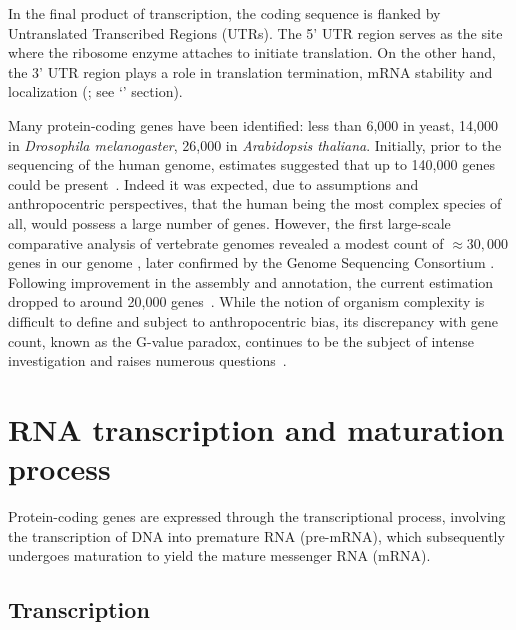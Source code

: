 In the final product of transcription, the coding sequence is flanked by Untranslated Transcribed Regions (\acrshort{UTR}s). The 5' \acrshort{UTR} region serves as the site where the ribosome enzyme attaches to initiate translation. On the other hand, the 3' \acrshort{UTR} region plays a role in translation termination, \acrshort{mRNA} stability and localization (\citet{ grzybowska_regulatory_2001, chabanon_zipcodes_2004, mayr_what_2019}; see `' section).

Many protein-coding genes have been identified: less than 6,000 in yeast, 14,000 in \textit{Drosophila melanogaster}, 26,000 in \textit{Arabidopsis thaliana}. Initially, prior to the sequencing of the human genome, estimates suggested that up to 140,000 genes could be present~\citep{fields_how_1994}. Indeed it was expected, due to assumptions and anthropocentric perspectives, that the human being the most complex species of all, would possess a large number of genes. However, the first large-scale comparative analysis of vertebrate genomes revealed a modest count of $\approx30,000$ genes in our genome \citep{roest_crollius_estimate_2000}, later confirmed by the Genome Sequencing Consortium \citep{lander_initial_2001, venter_sequence_2001}. Following improvement in the assembly and annotation, the current estimation dropped to around 20,000 genes~\citep{clamp_distinguishing_2007, ezkurdia_multiple_2014, piovesan_human_2019}. While the notion of organism complexity is difficult to define and subject to anthropocentric bias, its discrepancy with gene count, known as the G-value paradox, continues to be the subject of intense investigation and raises numerous questions~\citep{hahn_g-value_2002, straalen_introduction_2011, choi_c-_2020}. 

\section{RNA transcription and maturation process}
\label{sec:transcription}

Protein-coding genes are expressed through the transcriptional process, involving the transcription of DNA into premature \acrshort{RNA} (pre-\acrshort{mRNA}), which subsequently undergoes maturation to yield the mature messenger \acrshort{RNA} (\acrshort{mRNA}).

\subsection{Transcription}

